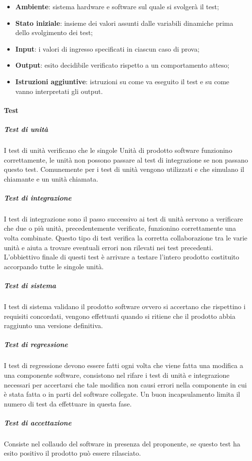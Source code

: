 			\begin{itemize}
				\item \textbf{Ambiente}: sistema hardware e software sul quale si svolgerà il test;
				\item \textbf{Stato iniziale}: insieme dei valori assunti dalle variabili dinamiche prima dello svolgimento dei test;
				\item \textbf{Input}: i valori di ingresso specificati in ciascun caso di prova;
				\item \textbf{Output}: esito decidibile verificato rispetto a un comportamento atteso;
				\item \textbf{Istruzioni aggiuntive}: istruzioni su come va eseguito il test e su come vanno interpretati gli output.
			\end{itemize}
		\paragraph{Test}
			\subparagraph{Test di unità} \Spazio
			I test di unità verificano che le singole Unità di prodotto software funzionino correttamente, le unità non possono passare al test di integrazione se non passano questo test.
			Comunemente per i test di unità vengono utilizzati  e  che simulano il chiamante e un unità chiamata.
			\subparagraph{Test di integrazione} \Spazio
			I test di integrazione sono il passo successivo ai test di unità servono a verificare che due o più unità, precedentemente verificate, funzionino correttamente una volta combinate.
			Questo tipo di test verifica la corretta collaborazione tra le varie unità e aiuta a trovare eventuali errori non rilevati nei test precedenti.
			L'obbiettivo finale di questi test è arrivare a testare l'intero prodotto costituito accorpando tutte le singole unità.
			\subparagraph{Test di sistema} \Spazio
			I test di sistema validano il prodotto software ovvero si accertano che rispettino i requisiti concordati, vengono effettuati quando si ritiene che il prodotto abbia raggiunto una versione definitiva.
			\subparagraph{Test di regressione}	\Spazio
			I test di regressione devono essere fatti ogni volta che viene fatta una modifica a una componente software, consistono nel rifare i test di unità e integrazione necessari per accertarsi che tale modifica non causi errori nella componente in cui è stata fatta o in parti del software collegate.
			Un buon incapsulamento limita il numero di test da effettuare in questa fase.				
			\subparagraph{Test di accettazione} \Spazio
			Consiste nel collaudo del software in presenza del proponente, se questo test ha esito positivo il prodotto può essere rilasciato.
